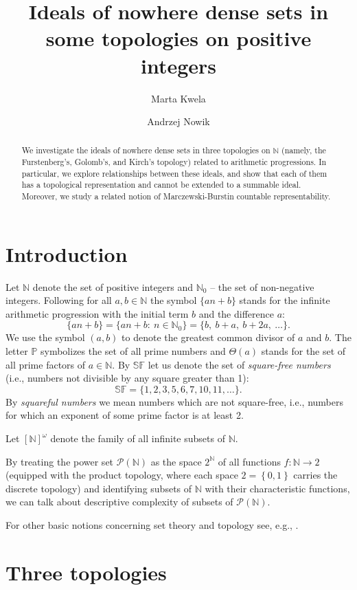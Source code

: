\documentclass{amsart}
\title[Ideals of nowhere dense sets in some topologies on positive integers]{Ideals of nowhere dense sets in some topologies on positive integers}
\author{Marta Kwela}
\author{Andrzej Nowik}
\theoremstyle{definition}
\newcommand{\N}{{\mathbb N}}
\newcommand{\SqrFr}{\mathbb{SF}}
\newcommand{\InfSubs}{[\N]^{\omega}}
\newcommand{\arithseq}[2]{\{#1n + #2\}}
\begin{document}
\begin{abstract}
We investigate the ideals of nowhere dense sets in three topologies on $\N$ (namely, the Furstenberg's, Golomb's, and Kirch's topology) related to arithmetic progressions. In particular, we explore relationships between these ideals, and show that each of them has a topological representation and cannot be extended to a summable ideal. Moreover, we study a related notion of Marczewski-Burstin countable representability.
\end{abstract}
\maketitle


\section{Introduction}

Let $\N$ denote the set of positive integers and $\N_0$ -- the set of non-negative integers. Following \cite{K} for all $a,b\in\N$ the symbol $\arithseq{a}{b}$ stands for the infinite arithmetic progression with the initial term $b$ and the difference $a$:
$$\arithseq{a}{b} = \{an+b :\ n\in\N_0\} = \{b,\ b+a,\ b+2a,\ \ldots\}. $$
We use the symbol $(a,b)$ to denote the greatest common divisor of $a$ and $b$. 
The letter $\mathbb{P}$ symbolizes the set of all prime numbers and $\Theta(a)$ stands for the set of all prime factors of $a\in\N$.
By $\mathbb{SF}$ let us denote the set of \emph{square-free numbers} (i.e., numbers not divisible by any square greater than 1):
$$\SqrFr = \{1,2,3,5,6,7,10,11,\ldots\}.$$
By \emph{squareful numbers} we mean numbers which are not square-free, i.e., numbers for which an exponent of some prime factor is at least 2.

Let $\InfSubs$ denote the family of all infinite subsets of $\N$. 

By treating the power set $\mathcal{P}(\N)$ as the space $2^\N$ of all functions $f\colon\N\to 2$ (equipped with the product topology, where each space $2= \left\{0,1\right\}$ carries the discrete topology) and identifying subsets of $\N$ with their characteristic functions, we can talk about descriptive complexity of subsets of $\mathcal{P}(\N)$.

For other basic notions concerning set theory and topology see, e.g., \cite{Kechris}.


\section*{Three topologies}
\end{document}
